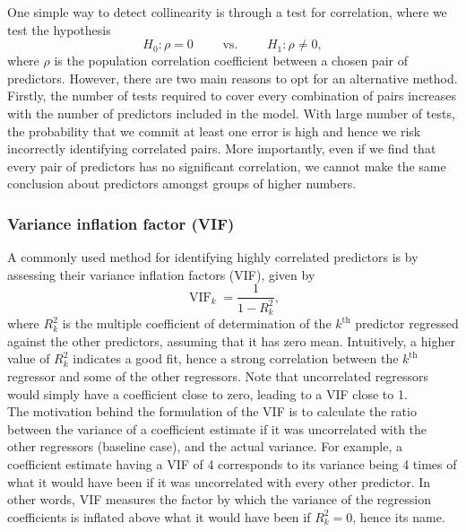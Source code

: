\documentclass[12pt]{article}
\DeclareMathOperator{\vif}{VIF}
\begin{document}
	One simple way to detect collinearity is through a test for correlation, where we test the hypothesis
	$$H_0: \rho=0 \quad\quad\text{ vs. }\quad\quad H_1: \rho\neq 0,$$
	where $\rho$ is the population correlation coefficient between a chosen pair of predictors. However, there are two main reasons to opt for an alternative method.\\
	
	Firstly, the number of tests required to cover every combination of pairs increases with the number of predictors included in the model. With large number of tests, the probability that we commit at least one error is high and hence we risk incorrectly identifying correlated pairs. More importantly, even if we find that every pair of predictors has no significant correlation, we cannot make the same conclusion about predictors amongst groups of higher numbers. 
	
	\subsubsection{Variance inflation factor (VIF)\label{sec:311}}
	A commonly used method for identifying highly correlated predictors is by assessing their variance inflation factors (VIF), given by
	\begin{equation}
		\vif_k=\frac{1}{1-R_{k}^2},
	\end{equation}
	where $R^2_k$ is the multiple coefficient of determination of the $k^{\text{th}}$ predictor regressed against the other predictors, assuming that it has zero mean. Intuitively, a higher value of $R^2_k$ indicates a good fit, hence a strong correlation between the $k^{\text{th}}$ regressor and some of the other regressors. Note that uncorrelated regressors would simply have a coefficient close to zero, leading to a VIF close to 1.\cite{James2023}\\
	
	The motivation behind the formulation of the VIF is to calculate the ratio between the variance of a coefficient estimate if it was uncorrelated with the other regressors (baseline case), and the actual variance. For example, a coefficient estimate having a VIF of 4 corresponds to its variance being 4 times of what it would have been if it was uncorrelated with every other predictor. In other words, VIF measures the factor by which the variance of the regression coefficients is inflated above what it would have been if $R_k^2=0$, hence its name. \\
	
\end{document}
